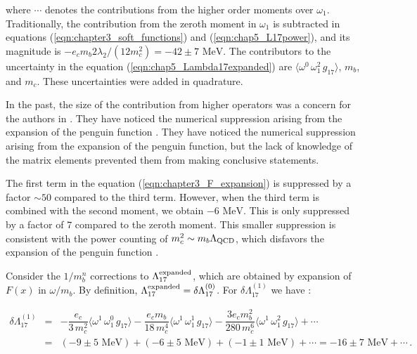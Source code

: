 where $\cdots$ denotes the contributions from the higher order moments over $\omega_1$. Traditionally, the contribution from the zeroth moment in $\omega_1$ is subtracted  in equations (\ref{eqn:chapter3_soft_functions}) and (\ref{eqn:chap5_L17power}), and its magnitude is $-e_cm_b2\lambda_2/(12m_c^2)=-42\pm7 \mbox{ MeV}$. The contributors to the uncertainty in the equation (\ref{eqn:chap5_Lambda17expanded}) are $\langle\omega^0\,\omega_1^2\,g_{17}\rangle$, $m_b$, and $m_c$. These uncertainties were added in quadrature.\par
In the past, the size of the contribution from higher operators was a concern for the authors in \cite{Voloshin:1996gw, Ligeti:1997tc, Grant:1997ec, Buchalla:1997ky}. They have noticed the numerical suppression arising from the expansion of the penguin function \cite{Gunawardana:2019gep}. They have noticed the numerical suppression arising from the expansion
of the penguin function, but the lack of knowledge of the matrix elements prevented
them from making conclusive statements.\par
The first term in the equation (\ref{eqn:chapter3_F_expansion}) is suppressed by a factor $\sim 50$ compared to the third term. However, when the third term is combined with the second moment, we obtain  $-6\mbox{ MeV}$. This is only suppressed by a factor of $7$ compared to the zeroth moment. This smaller suppression is consistent with the power counting of $m_c^2\sim m_b\Lambda_{\mbox{\scriptsize QCD}}$, which disfavors the expansion of the penguin function \cite{Gunawardana:2019gep}.\par
Consider the $1/m^n_b$ corrections to $\Lambda_{17}^{\mbox{\scriptsize expanded}}$, which are obtained by expansion of $F(x)$ in $\omega/m_b$. By definition, $\Lambda_{17}^{\mbox{\scriptsize expanded}}=\delta \Lambda_{17}^{(0)}$. For $\delta\Lambda_{17}^{(1)}$ we have  \cite{Gunawardana:2019gep}:

\begin{eqnarray}\label{eqn:chapter5_dLamda_17_1}
\delta \Lambda_{17}^{(1)}&=& -\dfrac{e_c}{3\,m_c^2} \langle\omega^1\,\omega_1^0\,g_{17}\rangle-\dfrac{e_cm_b}{18\,m_c^4} \langle\omega^1\,\omega_1^1\,g_{17}\rangle-\dfrac{3e_cm_b^2}{280\,m_c^6} \langle\omega^1\,\omega_1^2\,g_{17}\rangle+\cdots\nonumber\\
&=&\left(-9\pm5\mbox{ MeV}\right)+\left(-6\pm5\mbox{ MeV}\right)+\left(-1\pm1\mbox{ MeV}\right)+\cdots=-16\pm7\mbox{ MeV}+\cdots\,.\nonumber\\ 
\end{eqnarray}

